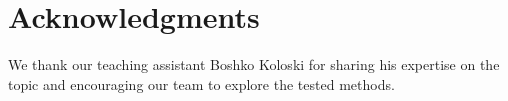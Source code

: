 \documentclass[fleqn,moreauthors,10pt]{ds_report}
\begin{document}



\section*{Acknowledgments}

We thank our teaching assistant Boshko Koloski for sharing his expertise on the topic and encouraging our team to explore the tested methods.




\end{document}
